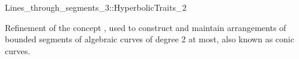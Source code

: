 \begin{ccRefConcept}{Lines_through_segments_3::HyperbolicTraits_2}

\ccDefinition
Refinement of the concept , used to construct and maintain arrangements of bounded segments of algebraic curves of degree 2 at most, also known as conic curves.

\ccHasModels
{}

\end{ccRefConcept}


